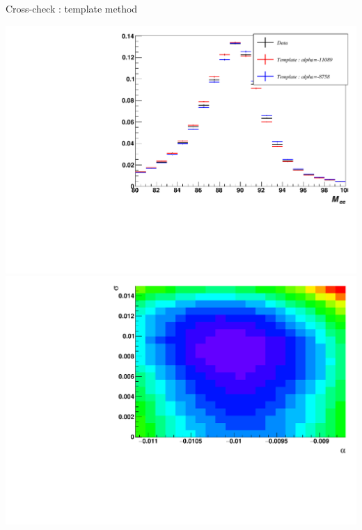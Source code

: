 \begin{frame}{Cross-check : template method}
\begin{minipage}{0.59\linewidth}
\end{minipage}
\hfill
\begin{minipage}{0.4\linewidth}
  \includegraphics[width=\linewidth]{plots/Backup/MC6_0_0_CompareAlpha.pdf}\\
  \includegraphics[width=\linewidth]{plots/Backup/MC6_0_0_chiMatrix.pdf}\\
\end{minipage}
\end{frame}

